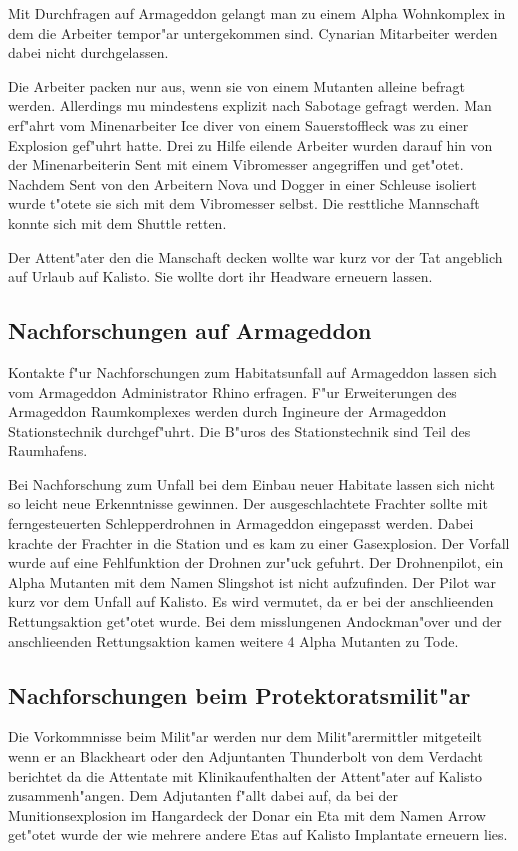 Mit Durchfragen auf Armageddon gelangt man zu einem Alpha Wohnkomplex in dem die Arbeiter tempor"ar untergekommen sind. Cynarian Mitarbeiter werden dabei nicht durchgelassen.

Die Arbeiter packen nur aus, wenn sie von einem Mutanten alleine befragt werden. Allerdings mu\3 mindestens explizit nach Sabotage gefragt werden. Man erf"ahrt vom Minenarbeiter Ice diver von einem Sauerstoffleck was zu einer Explosion gef"uhrt hatte. Drei zu Hilfe eilende Arbeiter wurden darauf hin von der Minenarbeiterin Sent mit einem Vibromesser angegriffen und get"otet. Nachdem Sent von den Arbeitern Nova und Dogger in einer Schleuse isoliert wurde t"otete sie sich mit dem Vibromesser selbst. Die resttliche Mannschaft konnte sich mit dem Shuttle retten.

Der Attent"ater den die Manschaft decken wollte war kurz vor der Tat angeblich auf Urlaub auf Kalisto. Sie wollte
dort ihr Headware erneuern lassen.

\subsection{Nachforschungen auf Armageddon}

Kontakte f"ur Nachforschungen zum Habitatsunfall auf Armageddon lassen sich vom Armageddon Administrator Rhino erfragen. F"ur Erweiterungen des Armageddon Raumkomplexes werden durch Ingineure der Armageddon Stationstechnik durchgef"uhrt. Die B"uros des Stationstechnik sind Teil des Raumhafens.

Bei Nachforschung zum Unfall bei dem Einbau neuer Habitate lassen sich nicht so leicht neue Erkenntnisse gewinnen. Der
ausgeschlachtete Frachter sollte  mit ferngesteuerten Schlepperdrohnen in Armageddon eingepasst werden. Dabei krachte
der Frachter in die Station und es kam zu einer Gasexplosion. Der Vorfall wurde auf eine Fehlfunktion der Drohnen
zur"uck gefuhrt. Der Drohnenpilot, ein Alpha Mutanten mit dem Namen Slingshot ist nicht aufzufinden. Der Pilot
war kurz vor dem Unfall auf Kalisto. Es wird  vermutet, da\3 er bei der anschlie\3enden Rettungsaktion get"otet wurde.
Bei dem misslungenen Andockman"over und der anschlie\3enden Rettungsaktion kamen weitere 4 Alpha Mutanten zu Tode.

\subsection{Nachforschungen beim Protektoratsmilit"ar}

Die Vorkommnisse beim Milit"ar werden nur dem Milit"arermittler mitgeteilt wenn er an Blackheart oder den Adjuntanten Thunderbolt von dem Verdacht berichtet da\3 die Attentate mit Klinikaufenthalten der Attent"ater auf Kalisto zusammenh"angen. Dem Adjutanten f"allt dabei auf, da\3 bei der Munitionsexplosion im Hangardeck der Donar ein Eta mit dem Namen Arrow get"otet wurde der wie mehrere andere Etas auf Kalisto Implantate erneuern lies.

